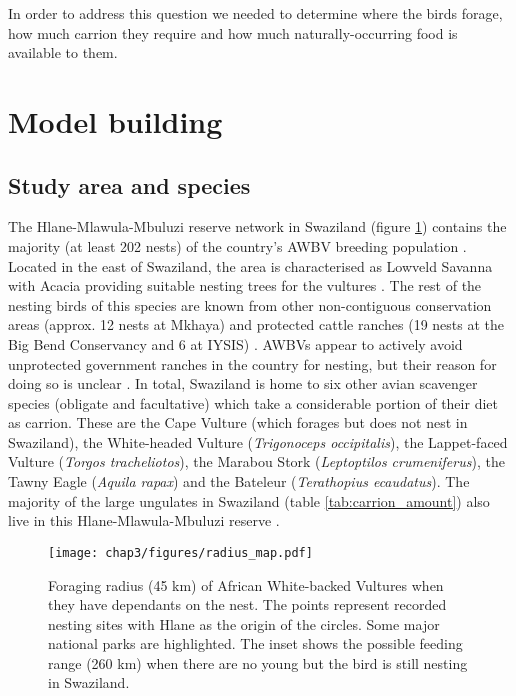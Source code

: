 In order to address this question we needed to determine where the birds forage, how much carrion they require and how much naturally-occurring food is available to them. 

\section{\uppercase{M}odel building}
\subsection{Study area and species}

The Hlane-Mlawula-Mbuluzi reserve network in Swaziland (figure \ref{fig:radius_map}) contains the majority (at least 202 nests) of the country's AWBV breeding population \citep{monadjem2005nesting}. Located in the east of Swaziland, the area is characterised as Lowveld Savanna \citep{acocks1988veld} with Acacia providing suitable nesting trees for the vultures \citep{monadjem2005nesting}. The rest of the nesting birds of this species are known from other non-contiguous conservation areas (approx. 12 nests at Mkhaya) and protected cattle ranches (19 nests at the Big Bend Conservancy and 6 at IYSIS) \citep{monadjem2005nesting}. AWBVs appear to actively avoid unprotected government ranches in the country for nesting, but their reason for doing so is unclear \citep{monadjem2005nesting}.  In total, Swaziland is home to six other avian scavenger species (obligate and facultative) which take a considerable portion of their diet as carrion. These are the Cape Vulture (which forages but does not nest in Swaziland), the White-headed Vulture (\textit {Trigonoceps occipitalis}), the Lappet-faced Vulture (\textit {Torgos tracheliotos}), the Marabou Stork (\textit {Leptoptilos crumeniferus}), the Tawny Eagle (\textit {Aquila rapax}) and the Bateleur (\textit {Terathopius ecaudatus}).  The majority of the large ungulates in Swaziland (table \ref{tab:carrion_amount}) also live in this Hlane-Mlawula-Mbuluzi reserve \citep{monadjem2003threatened}.

\begin{figure}[H] %
	  \centering
	  \texttt{[image: chap3/figures/radius\_map.pdf]}
	    \caption[Map of African White-backed Vulture foraging radius] %
	    {Foraging radius (45 km) of African White-backed Vultures when they have dependants on the nest. The points represent recorded nesting sites with Hlane as the origin of the circles.  Some major national parks are highlighted. The inset shows the possible feeding range (260 km) when there are no young but the bird is still nesting in Swaziland. }%
	  \label{fig:radius_map}
	\end{figure}
	
